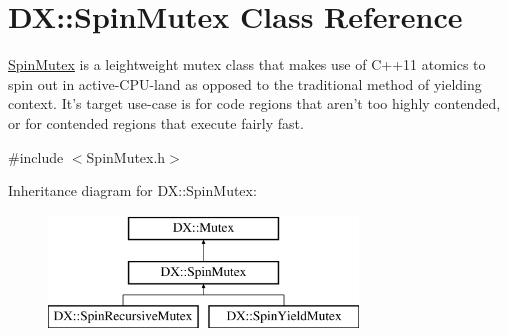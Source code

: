 \hypertarget{class_d_x_1_1_spin_mutex}{\section{D\-X\-:\-:Spin\-Mutex Class Reference}
\label{class_d_x_1_1_spin_mutex}
}


\hyperlink{class_d_x_1_1_spin_mutex}{Spin\-Mutex} is a leightweight mutex class that makes use of C++11 atomics to spin out in active-\/\-C\-P\-U-\/land as opposed to the traditional method of yielding context. It's target use-\/case is for code regions that aren't too highly contended, or for contended regions that execute fairly fast.  




{\ttfamily \#include $<$Spin\-Mutex.\-h$>$}

Inheritance diagram for D\-X\-:\-:Spin\-Mutex\-:\begin{figure}[H]
\begin{center}
\leavevmode
\includegraphics[height=3.000000cm]{class_d_x_1_1_spin_mutex}
\end{center}
\end{figure}
